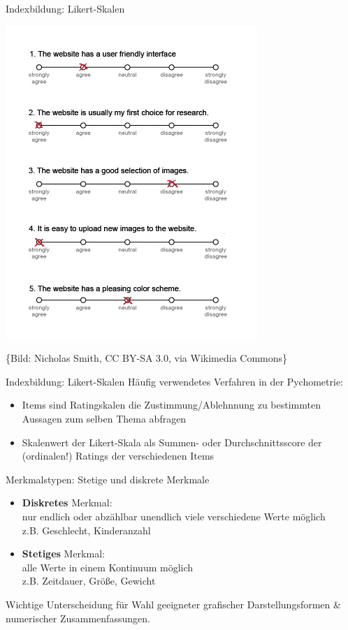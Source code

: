 \documentclass[
  10pt,
  ignorenonframetext,
]{beamer}
\providecommand{\tightlist}{%
  \setlength{\itemsep}{0pt}\setlength{\parskip}{0pt}}
\begin{document}
\begin{frame}{Indexbildung: Likert-Skalen}
\label{indexbildung-likert-skalen}
\begin{center}
       \includegraphics [height = .8\textheight]{pics/1-Example_Likert_Scale.jpg}
\end{center}

\{\scriptsize Bild: Nicholas Smith, CC BY-SA 3.0, via Wikimedia
Commons\}
\end{frame}

\begin{frame}{Indexbildung: Likert-Skalen}
\label{indexbildung-likert-skalen-1}
Häufig verwendetes Verfahren in der Pychometrie:

\begin{itemize}
\tightlist
\item
  Items sind Ratingskalen die Zustimmung/Ablehnnung zu bestimmten
  Aussagen zum selben Thema abfragen
\item
  Skalenwert der Likert-Skala als Summen- oder Durchschnittsscore der
  (ordinalen!) Ratings der verschiedenen Items
\end{itemize}
\end{frame}

\begin{frame}{Merkmalstypen: Stetige und diskrete Merkmale}
\label{merkmalstypen-stetige-und-diskrete-merkmale}
\begin{itemize}
\tightlist
\item
  \textbf{Diskretes} Merkmal:\\
  nur endlich oder abzählbar unendlich viele verschiedene Werte
  möglich\\
  z.B. Geschlecht, Kinderanzahl
\item
  \textbf{Stetiges} Merkmal:\\
  alle Werte in einem Kontinuum möglich\\
  z.B. Zeitdauer, Größe, Gewicht
\end{itemize}

Wichtige Unterscheidung für Wahl geeigneter grafischer
Darstellungsformen \& numerischer Zusammenfassungen.
\end{frame}
\end{document}
